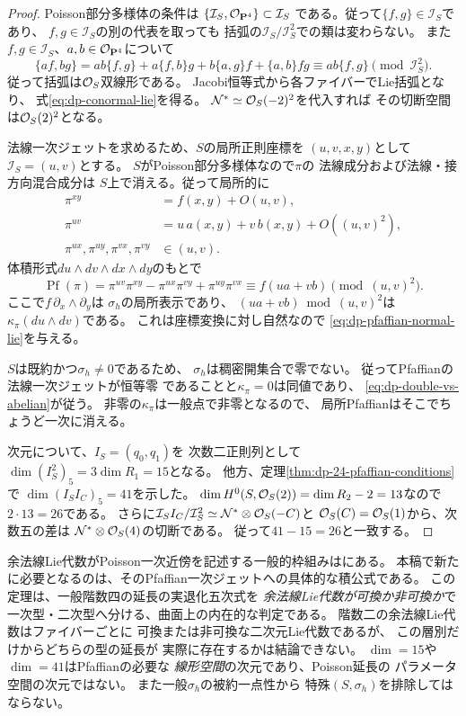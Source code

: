\begin{proof}
Poisson部分多様体の条件は
$\{\mathcal I_S,\mathcal O_{\mathbf P^4}\}\subset\mathcal I_S$
である。従って$\{f,g\}\in\mathcal I_S$であり、
$f,g\in\mathcal I_S$の別の代表を取っても
括弧の$\mathcal I_S/\mathcal I_S^2$での類は変わらない。
また$f,g\in\mathcal I_S$、$a,b\in\mathcal O_{\mathbf P^4}$について
\[
 \{af,bg\}=ab\{f,g\}
 +a\{f,b\}g+b\{a,g\}f+\{a,b\}fg
 \equiv ab\{f,g\}\pmod{\mathcal I_S^2}.
\]
従って括弧は$\mathcal O_S$双線形である。
Jacobi恒等式から各ファイバーでLie括弧となり、
式\eqref{eq:dp-conormal-lie}を得る。
$\mathcal N^*\simeq\mathcal O_S(-2)^2$を代入すれば
その切断空間は$\mathcal O_S(2)^2$となる。

法線一次ジェットを求めるため、$S$の局所正則座標を
$(u,v,x,y)$として$\mathcal I_S=(u,v)$とする。
$S$がPoisson部分多様体なので$\pi$の
法線成分および法線・接方向混合成分は
$S$上で消える。従って局所的に
\[
\begin{aligned}
 \pi^{xy}&=f(x,y)+O(u,v),\\
 \pi^{uv}&=u\,a(x,y)+v\,b(x,y)+O((u,v)^2),\\
 \pi^{ux},\pi^{uy},\pi^{vx},\pi^{vy}&\in(u,v).
\end{aligned}
\]
体積形式$du\wedge dv\wedge dx\wedge dy$のもとで
\[
 \operatorname{Pf}(\pi)
 =\pi^{uv}\pi^{xy}
   -\pi^{ux}\pi^{vy}+\pi^{uy}\pi^{vx}
 \equiv f(ua+vb)\pmod{(u,v)^2}.
\]
ここで$f\,\partial_x\wedge\partial_y$は
$\sigma_h$の局所表示であり、
$(ua+vb)\bmod(u,v)^2$は
$\kappa_\pi(du\wedge dv)$である。
これは座標変換に対し自然なので
\eqref{eq:dp-pfaffian-normal-lie}を与える。

$S$は既約かつ$\sigma_h\ne0$であるため、
$\sigma_h$は稠密開集合で零でない。
従ってPfaffianの法線一次ジェットが恒等零
であることと$\kappa_\pi=0$は同値であり、
\eqref{eq:dp-double-vs-abelian}が従う。
非零の$\kappa_\pi$は一般点で非零となるので、
局所Pfaffianはそこでちょうど一次に消える。

次元について、$I_S=(q_0,q_1)$を
次数二正則列として
$\dim(I_S^2)_5=3\dim R_1=15$となる。
他方、定理\ref{thm:dp-24-pfaffian-conditions}で
$\dim(I_S I_C)_5=41$を示した。
$\dim H^0(S,\mathcal O_S(2))
 =\dim R_2-2=13$なので
$2\cdot13=26$である。
さらに$\mathcal I_S I_C/\mathcal I_S^2
\simeq\mathcal N^*\otimes\mathcal O_S(-C)$と
$\mathcal O_S(C)=\mathcal O_S(1)$から、次数五の差は
$\mathcal N^*\otimes\mathcal O_S(4)$の切断である。
従って$41-15=26$と一致する。
\end{proof}

\begin{remark}[分類への使い方と限界]
余法線Lie代数がPoisson一次近傍を記述する一般的枠組みは\cite{FM2026}にある。
本稿で新たに必要となるのは、そのPfaffian一次ジェットへの具体的な積公式である。
この定理は、一般階数四の延長の実退化五次式を
\emph{余法線Lie代数が可換か非可換か}で
一次型・二次型へ分ける、曲面上の内在的な判定である。
階数二の余法線Lie代数はファイバーごとに
可換または非可換な二次元Lie代数であるが、
この層別だけからどちらの型の延長が
実際に存在するかは結論できない。
$\dim=15$や$\dim=41$はPfaffianの必要な
\emph{線形空間}の次元であり、Poisson延長の
パラメータ空間の次元ではない。
また一般$\sigma_h$の被約一点性から
特殊$(S,\sigma_h)$を排除してはならない。
\end{remark}


